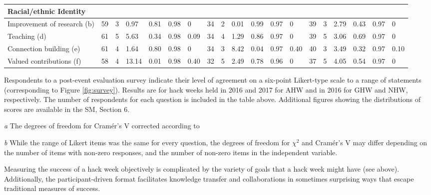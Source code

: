 \begin{table}
\begin{threeparttable}
\begin{tabularx}{18cm}{p{3.4cm}p{0.3cm}p{0.33cm}p{0.33cm}p{0.33cm}p{0.33cm}p{0.33cm}p{0.33cm}p{0.33cm}p{0.33cm}p{0.33cm}p{0.33cm}p{0.33cm}p{0.33cm}p{0.33cm}p{0.33cm}p{0.33cm}p{0.33cm}p{0.33cm}}
\multicolumn{16}{l}{\textbf{Racial/ethnic Identity}} \\ \midrule
Improvement of research (b)  & 59 & 3 & 0.97 & 0.81 & 0.98 & 0 & 34 &2 & 0.01 & 0.99 & 0.97 & 0 & 39 & 3 & 2.79 & 0.43 & 0.97 & 0 \\
Teaching (d) & 61 & 5 & 5.63 & 0.34 & 0.98 & 0.09 & 34 & 4 & 1.29 & 0.86 & 0.97 & 0 & 39 & 5 & 3.06 & 0.69 & 0.97 & 0 \\
Connection building (e) & 61 & 4 & 1.64 & 0.80 & 0.98 & 0 & 34 & 3 & 8.42 & 0.04 & 0.97 & 0.40 & 40 & 3 & 3.49 & 0.32 & 0.97 & 0.10 \\
Valued contributions (f) & 58 & 4 & 13.14 & 0.01 & 0.98 & 0.40 & 32 & 5 & 2.49 & 0.78 & 0.96 & 0 & 37 & 5 & 4.05 & 0.54 & 0.97 & 0 \\ 
\bottomrule
\end{tabularx}
   \begin{tablenotes}
      \item{Respondents to a post-event evaluation survey indicate their level of agreement on a six-point Likert-type scale to a range of statements (corresponding to Figure \ref{fig:survey}). Results are for hack weeks held in 2016 and 2017 for AHW and in 2016 for GHW and NHW, respectively. The number of respondents for each question is included in the table above. Additional figures showing the distributions of scores are available in the SM, Section 6.}
      \item[\emph{a}]{The degrees of freedom for Cram\'{e}r's V corrected according to~\citep{bergsma2013}}
      \item[\emph{b}]{While the range of Likert items was the same for every question, the degrees of freedom for $\chi^2$ and Cram\'{e}r's V may differ depending on the number of items with non-zero responses, and the number of non-zero items in the independent variable.}

\end{tablenotes}

\end{threeparttable}
\label{tab:survey}
\end{table}



Measuring the success of a hack week objectively is complicated by the variety of goals that a hack week might have (see above). 
Additionally, the participant-driven format facilitates knowledge transfer and collaborations in sometimes surprising ways that escape traditional measures of success.

